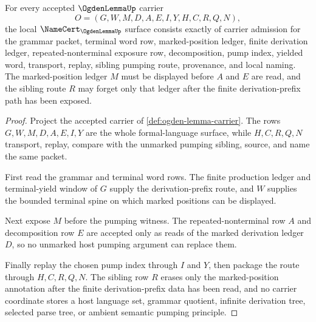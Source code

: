 \begin{theorem}
\label{thm:ogden-lemma-namecert-obligations}
For every accepted $\OgdenLemmaUp$ carrier
$$
O=(G,W,M,D,A,E,I,Y,H,C,R,Q,N),
$$
the local $\NameCert_{\OgdenLemmaUp}$ surface consists exactly of carrier
admission for the grammar packet, terminal word row, marked-position ledger,
finite derivation ledger, repeated-nonterminal exposure row, decomposition,
pump index, yielded word, transport, replay, sibling pumping route,
provenance, and local naming. The marked-position ledger $M$ must be displayed
before $A$ and $E$ are read, and the sibling route $R$ may forget only that
ledger after the finite derivation-prefix path has been exposed.
\end{theorem}
\begin{proof}
Project the accepted carrier of \autoref{def:ogden-lemma-carrier}. The rows
$G,W,M,D,A,E,I,Y$ are the whole formal-language surface, while $H,C,R,Q,N$
transport, replay, compare with the unmarked pumping sibling, source, and name
the same packet.

First read the grammar and terminal word rows. The finite production ledger
and terminal-yield window of $G$ supply the derivation-prefix route, and $W$
supplies the bounded terminal spine on which marked positions can be displayed.

Next expose $M$ before the pumping witness. The repeated-nonterminal row $A$
and decomposition row $E$ are accepted only as reads of the marked derivation
ledger $D$, so no unmarked host pumping argument can replace them.

Finally replay the chosen pump index through $I$ and $Y$, then package the
route through $H,C,R,Q,N$. The sibling row $R$ erases only the marked-position
annotation after the finite derivation-prefix data has been read, and no
carrier coordinate stores a host language set, grammar quotient, infinite
derivation tree, selected parse tree, or ambient semantic pumping principle.
\end{proof}

